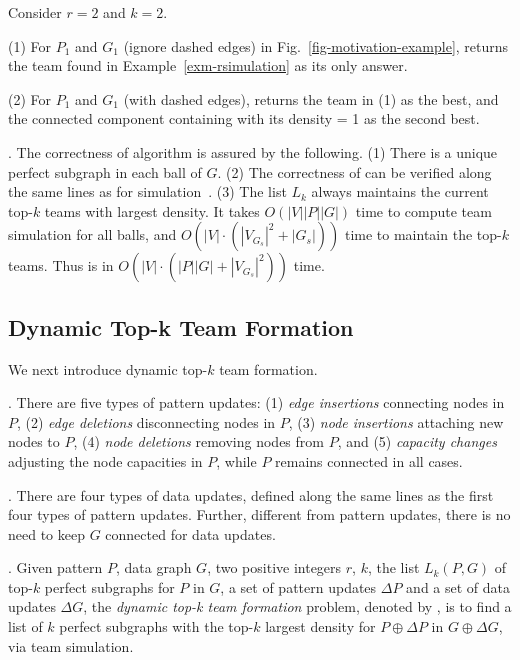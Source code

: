 {\begin{example}
\label{exa-alg-batch} Consider $r=2$ and $k=2$.

\sstab(1) For $P_1$ and $G_1$ (ignore dashed edges) in Fig.~\ref{fig-motivation-example},
 \grouprec returns the team found in Example~\ref{exm-rsimulation} as its only answer.

\sstab(2) For $P_1$ and $G_1$ (with dashed edges), \grouprec returns the team in (1) as the best,
and the connected component containing  with its density = 1 as the second best.
\end{example}


. The correctness of algorithm \grouprec is assured by the following.
(1) There is a unique perfect subgraph in each ball of $G$.
(2) The correctness of \rgraphsim can be verified along the same lines as for simulation~\cite{infsimu95}.
(3) The list $L_{k}$ always maintains the current top-$k$ teams with largest density.
It takes $O(|V||P||G|)$ time to compute team simulation for all balls,
and $O(|V|\cdot(|V_{G_s}|^2+|G_s|))$ time to maintain the top-$k$ teams.
Thus \grouprec is in $O(|V|\cdot(|P||G|+|V_{G_s}|^2))$ time.
}%


\subsection{Dynamic Top-k Team Formation}
\label{subsec-dynteamF}

We next introduce dynamic top-$k$ team formation.

. There are five types of pattern updates:
%
(1) {\em edge insertions} connecting nodes in $P$,
%
(2) {\em edge deletions} disconnecting nodes in $P$,
%
(3) {\em node insertions} attaching new nodes to $P$,
%
(4) {\em node deletions} removing nodes from $P$, and
%
(5) {\em capacity changes} adjusting the node capacities in $P$,
%
while $P$  remains connected in all cases.


. There are four types of data updates,
defined along the same lines as the first four types of pattern updates.
Further, different from pattern updates, there is no need to keep $G$ connected for data updates.


. Given pattern $P$, data graph $G$, two positive integers $r$, $k$, the list $L_{k}(P,G)$ of top-$k$ perfect subgraphs for $P$ in $G$,
a set of pattern updates $\Delta P$ and a set of data updates $\Delta G$,
the {\em dynamic top-k team formation} problem, denoted by ,
is to find a list of $k$ perfect subgraphs with the top-$k$ largest density for $P\oplus\Delta P$ in $G\oplus\Delta G$, via team simulation.


